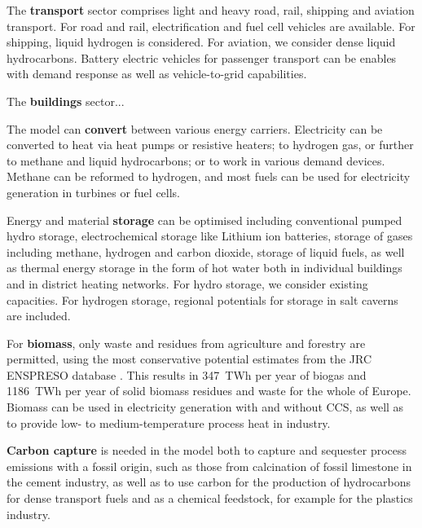 The \textbf{transport} sector comprises light and heavy road, rail, shipping and
aviation transport. For road and rail, electrification and fuel cell vehicles are
available. For shipping, liquid hydrogen is considered. For aviation, we
consider dense liquid hydrocarbons. Battery electric vehicles for passenger
transport can be enables with demand response as well as vehicle-to-grid
capabilities.

The \textbf{buildings} sector...

The model can \textbf{convert} between various energy carriers. Electricity can
be converted to heat via heat pumps or resistive heaters; to hydrogen gas, or
further to methane and liquid hydrocarbons; or to work in various demand
devices. Methane can be reformed to hydrogen, and most fuels can be used for
electricity generation in turbines or fuel cells.

Energy and material \textbf{storage} can be optimised including conventional
pumped hydro storage, electrochemical storage like Lithium ion batteries,
storage of gases including methane, hydrogen and carbon dioxide, storage of
liquid fuels, as well as thermal energy storage in the form of hot water both in
individual buildings and in district heating networks. For hydro storage, we
consider existing capacities. For hydrogen storage, regional potentials for
storage in salt caverns are included.

For \textbf{biomass}, only waste and residues from agriculture and forestry are
permitted, using the most conservative potential estimates from the JRC ENSPRESO
database \cite{jrcbiomass2015}. This results in 347~TWh per year of biogas and
1186~TWh per year of solid biomass residues and waste for the whole of Europe.
Biomass can be used in electricity generation with and without CCS, as well as
to provide low- to medium-temperature process heat in industry.

\textbf{Carbon capture} is needed in the model both to capture and sequester
process emissions with a fossil origin, such as those from calcination of fossil
limestone in the cement industry, as well as to use carbon for the
production of hydrocarbons for dense transport fuels and as a chemical
feedstock, for example for the plastics industry.